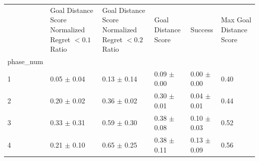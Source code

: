 \begin{tabular}{llllll}
\toprule
 & Goal Distance Score Normalized Regret $< 0.1$ Ratio & Goal Distance Score Normalized Regret $< 0.2$ Ratio & Goal Distance Score & Success & Max Goal Distance Score \\
phase_num &  &  &  &  &  \\
\midrule
1 & 0.05 $\pm$ 0.04 & 0.13 $\pm$ 0.14 & 0.09 $\pm$ 0.00 & 0.00 $\pm$ 0.00 & 0.40 \\
2 & 0.20 $\pm$ 0.02 & 0.36 $\pm$ 0.02 & 0.30 $\pm$ 0.01 & 0.04 $\pm$ 0.01 & 0.44 \\
3 & 0.33 $\pm$ 0.31 & 0.59 $\pm$ 0.30 & 0.38 $\pm$ 0.08 & 0.10 $\pm$ 0.03 & 0.52 \\
4 & 0.21 $\pm$ 0.10 & 0.65 $\pm$ 0.25 & 0.38 $\pm$ 0.11 & 0.13 $\pm$ 0.09 & 0.56 \\
\bottomrule
\end{tabular}
